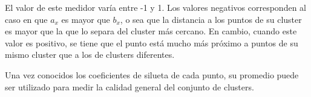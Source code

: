El valor de este medidor varía entre -1 y 1.
Los valores negativos corresponden al caso en que $a_x$ es mayor que $b_x$, o sea que la distancia a los puntos de su cluster es mayor que la que lo separa del cluster más cercano.
En cambio, cuando este valor es positivo, se tiene que el punto está mucho más próximo a puntos de su mismo cluster que a los de clusters diferentes.

Una vez conocidos los coeficientes de silueta de cada punto, su promedio puede ser utilizado para medir la calidad general del conjunto de clusters.

